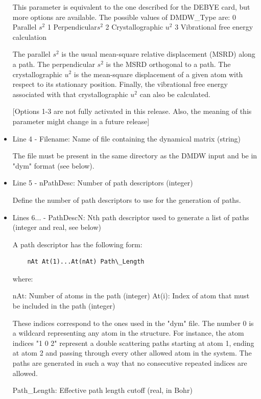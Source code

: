 \documentclass[11pt,oneside]{report} %
\begin{document}
\begin{latexonly}
\begin{itemize}
  This parameter is equivalent to the one described for the DEBYE card,
  but more options are available.
  The possible values of DMDW\_Type are:
	0	Parallel $s^{2}$
	1	Perpendicular$s^{2}$
	2	Crystallographic $u^{2}$
	3	Vibrational free energy calculation
	
  The parallel $s^{2}$ is the usual mean-square relative displacement (MSRD) along a
  path. The perpendicular $s^{2}$ is the MSRD orthogonal to a path. The
  crystallographic $u^{2}$ is the mean-square displacement of a given atom with
  respect to its stationary position. Finally, the vibrational free energy
  associated with that crystallographic $u^{2}$ can also be calculated.

  [Options 1-3 are not fully activated in this release. Also, 
  the meaning of this parameter might change in a future release]

\item Line  4 - Filename: Name of file containing the dynamical matrix (string)

  The file must be present in the same directory as the DMDW input and be in
  "dym" format (see below).

\item Line  5 - nPathDesc: Number of path descriptors (integer)

  Define the number of path descriptors to use for the generation of paths.
  
\item Lines 6... - PathDescN: Nth path descriptor used to generate a list of paths
                        (integer and real, see below)

  A path descriptor has the following form:
\begin{verbatim}  
    nAt At(1)...At(nAt) Path\_Length
\end{verbatim}    
  where:
  
    nAt: Number of atoms in the path (integer)
    At(i): Index of atom that must be included in the path (integer)

		These indices correspond to the ones used in the "dym" file. The
		number 0 is a wildcard representing any atom in the structure.
		For instance, the atom indices "1 0 2" represent a double
		scattering paths starting at atom 1, ending at atom 2 and
		passing through every other allowed atom in the system. The
		paths are generated in such a way that no consecutive repeated
		indices are allowed.

    Path\_Length: Effective path length cutoff (real, in Bohr)
    

\end{itemize}
\end{latexonly}
\end{document}
